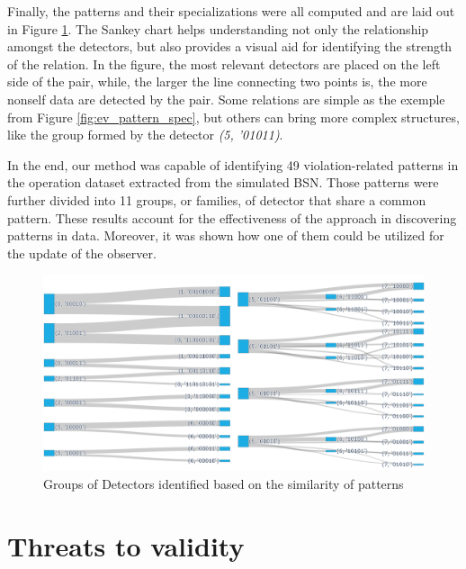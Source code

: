 Finally, the patterns and their specializations were all computed and are laid out in Figure \ref{fig:ev_sankey}. The Sankey chart helps understanding not only the relationship amongst the detectors, but also provides a visual aid for identifying the strength of the relation. In the figure, the most relevant detectors are placed on the left side of the pair, while, the larger the line connecting two points is, the more nonself data are detected by the pair. Some relations are simple as the exemple from Figure \ref{fig:ev_pattern_spec}, but others can bring more complex structures, like the group formed by the detector \textit{(5, '01011)}.

In the end, our method was capable of identifying 49 violation-related patterns in the operation dataset extracted from the simulated BSN. Those patterns were further divided into 11 groups, or families, of detector that share a common pattern. These results account for the effectiveness of the approach in discovering patterns in data. Moreover, it was shown how one of them could be utilized for the update of the observer.

\begin{figure}[]
	\centering
	\includegraphics[width=\textwidth, keepaspectratio]{img/sankey2.png}
	\caption{Groups of Detectors identified based on the similarity of patterns}
	\label{fig:ev_sankey}
\end{figure}


\section{Threats to validity}